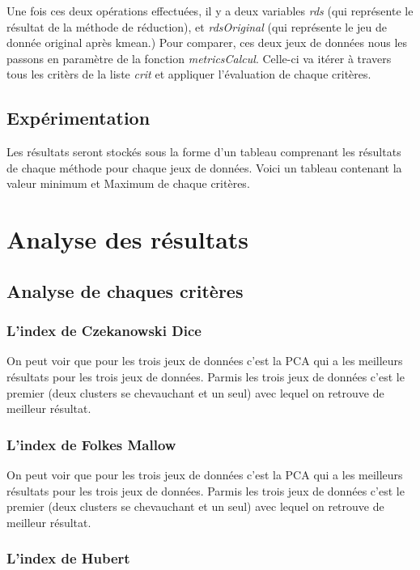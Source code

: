 Une fois ces deux opérations effectuées, il y a deux variables \textit{rds} (qui représente le résultat de la méthode de réduction), et \textit{rdsOriginal} (qui représente le jeu de
donnée original après kmean.) Pour comparer, ces deux jeux de données nous les passons en paramètre de la fonction \textit{metricsCalcul}.
Celle-ci va itérer à travers tous les critèrs de la liste \textit{crit} et appliquer l'évaluation de chaque critères.

\subsection{Expérimentation}
Les résultats seront stockés sous la forme d'un tableau comprenant les résultats de chaque méthode pour chaque jeux de données. 
Voici un tableau contenant la valeur minimum et Maximum de chaque critères.

\section{Analyse des résultats}

\subsection{Analyse de chaques critères}

\subsubsection{L'index de Czekanowski Dice}
On peut voir que pour les trois jeux de données c'est la PCA qui a les meilleurs résultats pour les trois jeux de données.
Parmis les trois jeux de données c'est le premier (deux clusters se chevauchant et un seul) avec lequel on retrouve de meilleur résultat.

\subsubsection{L'index de Folkes Mallow}
On peut voir que pour les trois jeux de données c'est la PCA qui a les meilleurs résultats pour les trois jeux de données.
Parmis les trois jeux de données c'est le premier (deux clusters se chevauchant et un seul) avec lequel on retrouve de meilleur résultat.

\subsubsection{L'index de Hubert}

